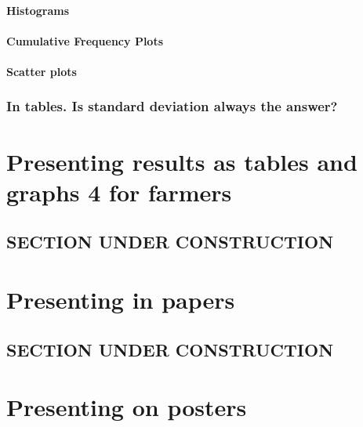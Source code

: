 \documentclass[
]{book}
\begin{document}
\hypertarget{histograms}{%
\subsubsection{Histograms}\label{histograms}}

\hypertarget{cumulative-frequency-plots}{%
\subsubsection{Cumulative Frequency Plots}\label{cumulative-frequency-plots}}

\hypertarget{scatter-plots}{%
\subsubsection{Scatter plots}\label{scatter-plots}}

\hypertarget{in-tables.-is-standard-deviation-always-the-answer}{%
\subsection{In tables. Is standard deviation always the answer?}\label{in-tables.-is-standard-deviation-always-the-answer}}

\hypertarget{farmers}{%
\chapter{Presenting results as tables and graphs 4 for farmers}\label{farmers}}

\hypertarget{section-under-construction-1}{%
\section{SECTION UNDER CONSTRUCTION}\label{section-under-construction-1}}

\hypertarget{papers}{%
\chapter{Presenting in papers}\label{papers}}

\hypertarget{section-under-construction-2}{%
\section{SECTION UNDER CONSTRUCTION}\label{section-under-construction-2}}

\hypertarget{posters}{%
\chapter{Presenting on posters}\label{posters}}
\end{document}
